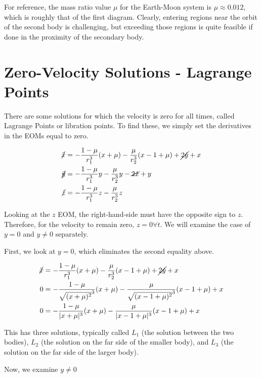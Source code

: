\documentclass{article}
\begin{document}
For reference, the mass ratio value $\mu$ for the Earth-Moon system is $\mu\approx0.012$, which is roughly that of the first diagram. Clearly, entering regions near the orbit of the second body is challenging, but exceeding those regions is quite feasible if done in the proximity of the secondary body.

\section*{Zero-Velocity Solutions - Lagrange Points}

There are some solutions for which the velocity is zero for all times, called Lagrange Points or libration points. To find these, we simply set the derivatives in the EOMs equal to zero.

\[\begin{aligned}
    \cancel{\ddot{x}}&=-\frac{1-\mu}{r_1^3}(x+\mu)-\frac{\mu}{r_2^3}(x-1+\mu)+\cancel{2\dot{y}}+x\\
    \cancel{\ddot{y}}&=-\frac{1-\mu}{r_1^3}y-\frac{\mu}{r_2^3}y-\cancel{2\dot{x}}+y\\
    \cancel{\ddot{z}}&=-\frac{1-\mu}{r_1^3}z-\frac{\mu}{r_2^3}z
\end{aligned}\]

Looking at the $z$ EOM, the right-hand-side must have the opposite sign to $z$. Therefore, for the velocity to remain zero, $z=0\forall t$. We will examine the case of $y=0$ and $y\ne0$ separately.

First, we look at $y=0$, which eliminates the second equality above.

\[\begin{aligned}
    \cancel{\ddot{x}}&=-\frac{1-\mu}{r_1^3}(x+\mu)-\frac{\mu}{r_2^3}(x-1+\mu)+\cancel{2\dot{y}}+x\\
    0&=-\frac{1-\mu}{\sqrt{(x+\mu)^2}^3}(x+\mu)-\frac{\mu}{\sqrt{(x-1+\mu)^2}^3}(x-1+\mu)+x\\
    0&=-\frac{1-\mu}{|x+\mu|^3}(x+\mu)-\frac{\mu}{|x-1+\mu|^3}(x-1+\mu)+x
\end{aligned}\]

This has three solutions, typically called $L_1$ (the solution between the two bodies), $L_2$ (the solution on the far side of the smaller body), and $L_3$ (the solution on the far side of the larger body).

Now, we examine $y\ne0$
\end{document}
